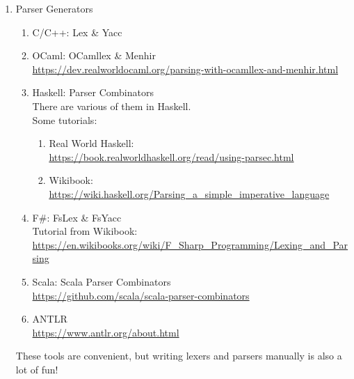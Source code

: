 \documentclass{article}
\begin{document}
\begin{enumerate}
    \item Parser Generators
    \begin{enumerate}
        \item C/C++: Lex \& Yacc \cite{levine1992lex}
        \item OCaml: OCamllex \& Menhir\\
        \href{https://dev.realworldocaml.org/parsing-with-ocamllex-and-menhir.html}{https://dev.realworldocaml.org/parsing-with-ocamllex-and-menhir.html}
        \item Haskell: Parser Combinators\\
        There are various of them in Haskell.\\
        Some tutorials:
        \begin{enumerate}
            \item Real World Haskell: \\
            \href{https://book.realworldhaskell.org/read/using-parsec.html}{https://book.realworldhaskell.org/read/using-parsec.html}
            \item Wikibook: \\
            \href{https://wiki.haskell.org/Parsing_a_simple_imperative_language}{https://wiki.haskell.org/Parsing\_a\_simple\_imperative\_language}
        \end{enumerate}
        \item F\#: FsLex \& FsYacc\\
        Tutorial from Wikibook:\\
        \href{https://en.wikibooks.org/wiki/F_Sharp_Programming/Lexing_and_Parsing}{https://en.wikibooks.org/wiki/F\_Sharp\_Programming/Lexing\_and\_Parsing}
        \item Scala: Scala Parser Combinators\\
        \href{https://github.com/scala/scala-parser-combinators}{https://github.com/scala/scala-parser-combinators}
        \item ANTLR\\
        \href{https://www.antlr.org/about.html}{https://www.antlr.org/about.html}
    \end{enumerate}
    These tools are convenient, but writing lexers and parsers manually is also a lot of fun!


\end{enumerate}
\end{document}
